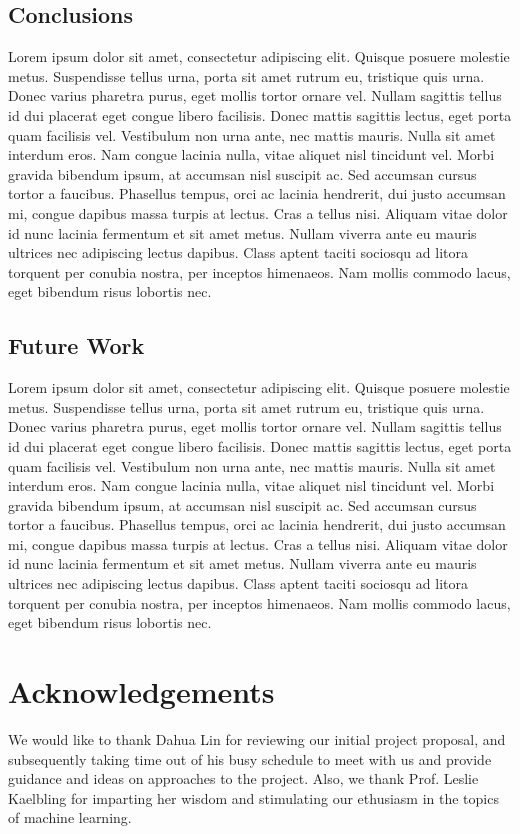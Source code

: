 \documentclass[12pt]{article}
\begin{document}
	\subsection{Conclusions}
	Lorem ipsum dolor sit amet, consectetur adipiscing elit. Quisque posuere molestie metus. Suspendisse tellus urna, porta sit amet rutrum eu, tristique quis urna. Donec varius pharetra purus, eget mollis tortor ornare vel. Nullam sagittis tellus id dui placerat eget congue libero facilisis. Donec mattis sagittis lectus, eget porta quam facilisis vel. Vestibulum non urna ante, nec mattis mauris. Nulla sit amet interdum eros. Nam congue lacinia nulla, vitae aliquet nisl tincidunt vel. Morbi gravida bibendum ipsum, at accumsan nisl suscipit ac. Sed accumsan cursus tortor a faucibus. Phasellus tempus, orci ac lacinia hendrerit, dui justo accumsan mi, congue dapibus massa turpis at lectus. Cras a tellus nisi. Aliquam vitae dolor id nunc lacinia fermentum et sit amet metus. Nullam viverra ante eu mauris ultrices nec adipiscing lectus dapibus. Class aptent taciti sociosqu ad litora torquent per conubia nostra, per inceptos himenaeos. Nam mollis commodo lacus, eget bibendum risus lobortis nec.
	\subsection{Future Work}
	Lorem ipsum dolor sit amet, consectetur adipiscing elit. Quisque posuere molestie metus. Suspendisse tellus urna, porta sit amet rutrum eu, tristique quis urna. Donec varius pharetra purus, eget mollis tortor ornare vel. Nullam sagittis tellus id dui placerat eget congue libero facilisis. Donec mattis sagittis lectus, eget porta quam facilisis vel. Vestibulum non urna ante, nec mattis mauris. Nulla sit amet interdum eros. Nam congue lacinia nulla, vitae aliquet nisl tincidunt vel. Morbi gravida bibendum ipsum, at accumsan nisl suscipit ac. Sed accumsan cursus tortor a faucibus. Phasellus tempus, orci ac lacinia hendrerit, dui justo accumsan mi, congue dapibus massa turpis at lectus. Cras a tellus nisi. Aliquam vitae dolor id nunc lacinia fermentum et sit amet metus. Nullam viverra ante eu mauris ultrices nec adipiscing lectus dapibus. Class aptent taciti sociosqu ad litora torquent per conubia nostra, per inceptos himenaeos. Nam mollis commodo lacus, eget bibendum risus lobortis nec.

\section{Acknowledgements}
	We would like to thank Dahua Lin for reviewing our initial project proposal, and subsequently taking time out of his busy schedule to meet with us and provide guidance and ideas on approaches to the project. Also, we thank Prof. Leslie Kaelbling for imparting her wisdom and stimulating our ethusiasm in the topics of machine learning. 
	 
\end{document}
